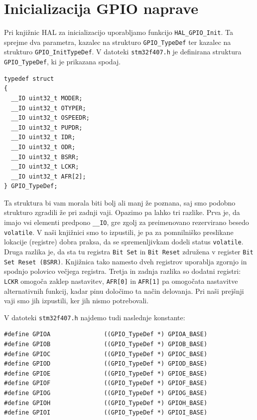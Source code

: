 \documentclass[12pt,letterpaper]{article}
\begin{document}
\section*{Inicializacija GPIO naprave}

Pri knjižnic HAL za inicializacijo uporabljamo funkcijo \texttt{HAL\_GPIO\_Init}. Ta sprejme dva parametra, kazalec na strukturo \texttt{GPIO\_TypeDef} ter kazalec na strukturo \texttt{GPIO\_InitTypeDef}. V datoteki \texttt{stm32f407.h} je definirana struktura \texttt{GPIO\_TypeDef}, ki je prikazana spodaj.

\begin{center}
\begin{lstlisting}[style=CStyle]
typedef struct
{
  __IO uint32_t MODER;
  __IO uint32_t OTYPER;
  __IO uint32_t OSPEEDR;
  __IO uint32_t PUPDR;
  __IO uint32_t IDR;
  __IO uint32_t ODR;
  __IO uint32_t BSRR;
  __IO uint32_t LCKR;
  __IO uint32_t AFR[2];
} GPIO_TypeDef;
\end{lstlisting}
\end{center}

Ta struktura bi vam morala biti bolj ali manj že poznana, saj smo podobno strukturo zgradili že pri zadnji vaji. Opazimo pa lahko tri razlike. Prva je, da imajo vsi elementi predpono \texttt{\_\_IO}, gre zgolj za preimenovano rezervirano besedo \texttt{volatile}. V naši knjižnici smo to izpustili, je pa za pomnilniško preslikane lokacije (registre) dobra praksa, da se spremenljivkam dodeli status \texttt{volatile}. Druga razlika je, da sta tu registra \texttt{Bit Set} in \texttt{Bit Reset} združena v register \texttt{Bit Set Reset (BSRR)}. Knjižnica tako namesto dveh registrov uporablja zgornjo in spodnjo polovico večjega registra. Tretja in zadnja razlika so dodatni registri: \texttt{LCKR} omogoča zaklep nastavitev, \texttt{AFR[0]} in \texttt{AFR[1]} pa omogočata nastavitve alternativnih funkcij, kadar pinu določimo ta način delovanja. Pri naši prejšnji vaji smo jih izpustili, ker jih nismo potrebovali.

V datoteki \texttt{stm32f407.h} najdemo tudi naslednje konstante:

\begin{center}
\begin{lstlisting}[style=CStyle]
#define GPIOA               ((GPIO_TypeDef *) GPIOA_BASE)
#define GPIOB               ((GPIO_TypeDef *) GPIOB_BASE)
#define GPIOC               ((GPIO_TypeDef *) GPIOC_BASE)
#define GPIOD               ((GPIO_TypeDef *) GPIOD_BASE)
#define GPIOE               ((GPIO_TypeDef *) GPIOE_BASE)
#define GPIOF               ((GPIO_TypeDef *) GPIOF_BASE)
#define GPIOG               ((GPIO_TypeDef *) GPIOG_BASE)
#define GPIOH               ((GPIO_TypeDef *) GPIOH_BASE)
#define GPIOI               ((GPIO_TypeDef *) GPIOI_BASE)
\end{lstlisting}
\end{center}
\end{document}

